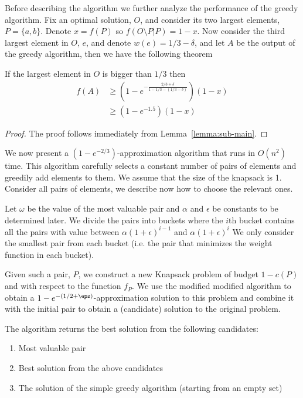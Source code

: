 Before describing the algorithm we further analyze the performance of the greedy algorithm.
Fix an optimal solution, $O$, and consider its two largest elements, $P = \{a, b\}$.
Denote $x = f(P)$ so $f(O \setminus P | P) = 1 - x$.
Now consider the third largest element in $O$, $e$, and denote $w(e) = 1/3 - \delta$,
and let $A$ be the output of the greedy algorithm, then we have the following theorem

\begin{lemma}
	\label{eq:sub:greedy}
	If the largest element in $O$ is bigger than $1/3$ then
	\begin{align*}
		f(A) & \geq (1-e^{-\frac{2/3 + \delta}{1 - 1/3 - (1/3 - \delta)}})(1 - x)
		\\		& \geq (1 - e^{-1.5})(1 - x)
	\end{align*}
\end{lemma}

\begin{proof}
	The proof follows immediately from Lemma~\ref{lemma:sub-main}.
\end{proof}

We now present a $(1-e^{-2/3})$-approximation algorithm that runs in $O(n^2)$ time.
This algorithm carefully selects a constant number of pairs of elements and greedily
add elements to them.
We assume that the size of the knapsack is 1.
Consider all pairs of elements, we describe now how to choose the relevant ones.

Let $\omega$ be the value of the most valuable pair and $\alpha$ and $\epsilon$ be constants to be determined later.
We divide the pairs into buckets where the $i$th bucket contains all the pairs with value
between $\alpha (1 + \epsilon)^{i - 1}$ and $\alpha (1 + \epsilon)^{i}$
We only consider the smallest pair from each bucket
(i.e. the pair that minimizes the weight function in each bucket).

Given such a pair, $P$, we construct a new Knapsack problem of budget $1 - c(P)$ and with respect to the function $f_P$.
We use the modified modified algorithm to obtain a $1-e^{-(1/2 + \eps)}$-approximation
solution to this problem and combine it with the initial pair to obtain a (candidate)
solution to the original problem.

The algorithm returns the best solution from the following candidates:
\begin{enumerate}
	\item Most valuable pair
	\item Best solution from the above candidates
	\item The solution of the simple greedy algorithm (starting from an empty set)
\end{enumerate}

